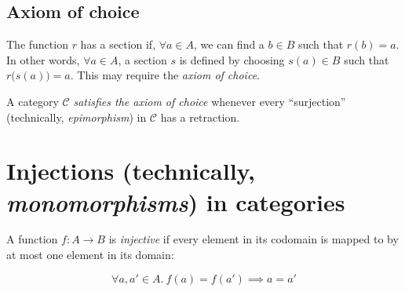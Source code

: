 \subsection{Axiom of choice}
\begin{center}
\end{center}

The function $r$ has a section if, $\forall a \in A$, we can find a $b \in B$
such that $r(b) = a$.  In other words, $\forall a \in A$, a section $s$ is
defined by choosing $s(a) \in B$ such that $r\big(s(a)\big) = a$.  This may
require the \emph{axiom of choice}.

\begin{definition}
A category $\mathcal{C}$ \emph{satisfies the axiom of choice} whenever every
``surjection'' (technically, \emph{epimorphism}) in $\mathcal{C}$ has a
retraction.
\end{definition}

\section{Injections (technically, \emph{monomorphisms}) in categories}

A function $f : A \rightarrow B$ is \emph{injective} if every element in its
codomain is mapped to by at most one element in its domain:

\begin{equation*}
    \forall a, a' \in A.\ f(a) = f(a') \implies a = a'
\end{equation*}

